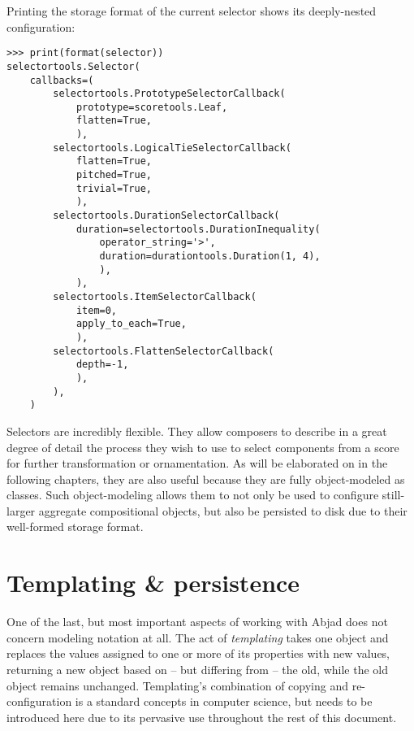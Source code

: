\noindent Printing the storage format of the current selector shows its
deeply-nested configuration:

\begin{comment}
<abjad>
print(format(selector))
</abjad>
\end{comment}

\begin{abjadbookoutput}
\begin{singlespacing}
\vspace{-0.5\baselineskip}
\begin{verbatim}
>>> print(format(selector))
selectortools.Selector(
    callbacks=(
        selectortools.PrototypeSelectorCallback(
            prototype=scoretools.Leaf,
            flatten=True,
            ),
        selectortools.LogicalTieSelectorCallback(
            flatten=True,
            pitched=True,
            trivial=True,
            ),
        selectortools.DurationSelectorCallback(
            duration=selectortools.DurationInequality(
                operator_string='>',
                duration=durationtools.Duration(1, 4),
                ),
            ),
        selectortools.ItemSelectorCallback(
            item=0,
            apply_to_each=True,
            ),
        selectortools.FlattenSelectorCallback(
            depth=-1,
            ),
        ),
    )
\end{verbatim}
\end{singlespacing}
\end{abjadbookoutput}

\noindent Selectors are incredibly flexible. They allow composers to describe
in a great degree of detail the process they wish to use to select components
from a score for further transformation or ornamentation. As will be elaborated
on in the following chapters, they are also useful because they are fully
object-modeled as classes. Such object-modeling allows them to not only be used
to configure still-larger aggregate compositional objects, but also be
persisted to disk due to their well-formed storage format.

\section{Templating \& persistence}
\label{sec:templating-and-persistence}

One of the last, but most important aspects of working with Abjad does not
concern modeling notation at all. The act of \emph{templating} takes one object
and replaces the values assigned to one or more of its properties with new
values, returning a new object based on -- but differing from -- the old, while
the old object remains unchanged. Templating's combination of copying and
re-configuration is a standard concepts in computer science, but needs to be
introduced here due to its pervasive use throughout the rest of this document.

